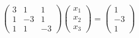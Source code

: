 \documentclass[preview]{standalone}
\begin{document}
\begin{align*}
\begin{pmatrix}3 & 1 & 1 \\1 & -3 & 1 \\1 & 1 & -3\end{pmatrix}\begin{pmatrix} x_1 \\ x_2 \\ x_3 \end{pmatrix}= \begin{pmatrix} 1 \\ -3 \\ 1 \end{pmatrix}
\end{align*}
\end{document}

